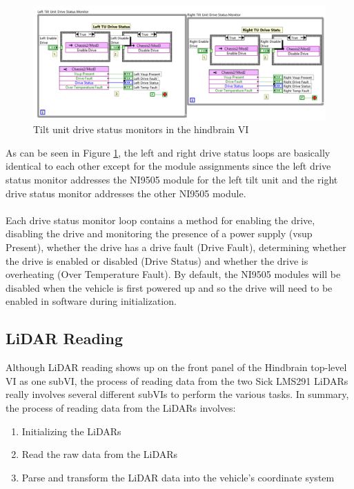 \newpage

\begin{figure}[h!]
\centering
\includegraphics[scale=1.2]{Photos/tudrivestat.png}
\caption{Tilt unit drive status monitors in the hindbrain VI}
\label{fig:tudrivestat}
\end{figure}

\noindent As can be seen in Figure \ref{fig:tudrivestat}, the left and right drive status loops are basically identical to each other except for the module assignments since the left drive status monitor addresses the NI9505 module for the left tilt unit and the right drive status monitor addresses the other NI9505 module. \\ \\
%
Each drive status monitor loop contains a method for enabling the drive, disabling the drive and monitoring the presence of a power supply (vsup Present), whether the drive has a drive fault (Drive Fault), determining whether the drive is enabled or disabled (Drive Status) and whether the drive is overheating (Over Temperature Fault). By default, the NI9505 modules will be disabled when the vehicle is first powered up and so the drive will need to be enabled in software during initialization. 

\subsection{LiDAR Reading}

Although LiDAR reading shows up on the front panel of the Hindbrain top-level VI as one subVI, the process of reading data from the two Sick LMS291 LiDARs really involves several different subVIs to perform the various tasks. In summary, the process of reading data from the LiDARs involves:

\begin{enumerate}
\item Initializing the LiDARs
\item Read the raw data from the LiDARs
\item Parse and transform the LiDAR data into the vehicle's coordinate system
\end{enumerate}

